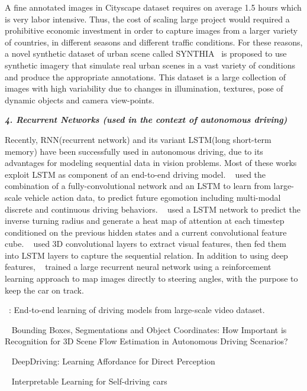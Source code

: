 \documentclass[10pt,twocolumn,letterpaper]{article}
\begin{document}
A fine annotated images in Cityscape dataset requires on average 1.5 hours which is very labor intensive. Thus, the cost of scaling large project would required a prohibitive economic investment in order to capture images from a larger variety of countries, in different seasons and different traffic conditions. For these reasons, a novel synthetic dataset of urban scene called SYNTHIA~\cite{ros2016synthia} is proposed to use synthetic imagery that simulate real urban scenes in a vast variety of conditions and produce the appropriate annotations.
This dataset is a large collection of images with high variability due to changes in illumination, textures, pose of dynamic objects and camera view-points.

\textbf{\emph{4. Recurrent Networks (used in the context of autonomous driving)}}


Recently, RNN(recurrent network) and its variant LSTM(long short-term memory) have been successfully used in autonomous driving, due to its advantages for modeling sequential data in vision problems. Most of these works exploit LSTM as component of an end-to-end driving model. ~\cite{xu2017end} used the combination of a fully-convolutional network and an LSTM to learn from large-scale vehicle action data, to predict future egomotion including multi-modal discrete and continuous driving behaviors. ~\cite{kim2017interpretable} used a LSTM network to predict the inverse turning radius and generate a heat map of attention at each timestep conditioned on the previous hidden states and a current convolutional feature cube. ~\cite{duself} used 3D convolutional layers to extract visual features, then fed them into LSTM layers to capture the sequential relation. In addition to using deep features, ~\cite{koutnik2013evolving} trained a large recurrent neural network using a reinforcement learning approach to map images directly to steering angles, with the purpose to keep the car on track.

~\cite{xu2017end}: End-to-end learning of driving models from large-scale video dataset.

~\cite{behl2017bounding} Bounding Boxes, Segmentations and Object Coordinates: How Important is Recognition for 3D Scene Flow Estimation in Autonomous Driving Scenarios?

~\cite{chen2015deepdriving} DeepDriving: Learning Affordance for Direct Perception

~\cite{kim2017interpretable} Interpretable Learning for Self-driving cars
\end{document}
